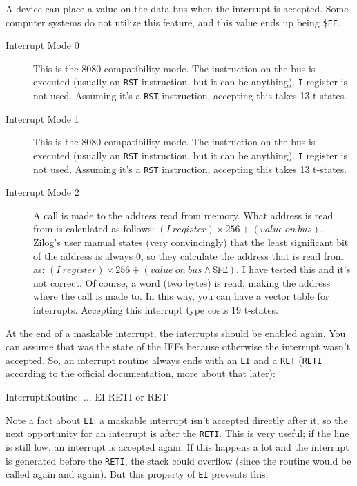 A device can place a value on the data bus when the interrupt is accepted. Some computer systems do not utilize this feature, and this value ends up being {\tt \$FF}.

\begin{description}

	\item[Interrupt Mode 0]
	This is the 8080 compatibility mode. The instruction on the bus is executed (usually an {\tt RST} instruction, but it can be anything). {\tt I} register is not used. Assuming it's a {\tt RST} instruction, accepting this takes 13 t-states.

	\item[Interrupt Mode 1]
	This is the 8080 compatibility mode. The instruction on the bus is executed (usually an {\tt RST} instruction, but it can be anything). {\tt I} register is not used. Assuming it's a {\tt RST} instruction, accepting this takes 13 t-states.

	\item[Interrupt Mode 2]
	A call is made to the address read from memory. What address is read from is calculated as follows: $(I\ register) \times 256 + (value\ on\ bus)$. Zilog's user manual states (very convincingly) that the least significant bit of the address is always 0, so they calculate the address that is read from as: $(I\ register) \times 256 + (value\ on\ bus \wedge \mathtt{\$FE})$. I have tested this and it's not correct. Of course, a word (two bytes) is read, making the address where the call is made to. In this way, you can have a vector table for interrupts. Accepting this interrupt type costs 19 t-states.

\end{description}

At the end of a maskable interrupt, the interrupts should be enabled again. You can assume that was the state of the IFFs because otherwise the interrupt wasn't accepted. So, an interrupt routine always ends with an {\tt EI} and a {\tt RET} ({\tt RETI} according to the official documentation, more about that later):

\begin{tcblisting}{}
InterruptRoutine:
	...
	EI
	RETI or RET
\end{tcblisting}

Note a fact about {\tt EI}: a maskable interrupt isn't accepted directly after it, so the next opportunity for an interrupt is after the {\tt RETI}. This is very useful; if the  line is still low, an interrupt is accepted again.  If this happens a lot and the interrupt is generated before the {\tt RETI}, the stack could overflow (since the routine would be called again and again). But this property of {\tt EI} prevents this.

